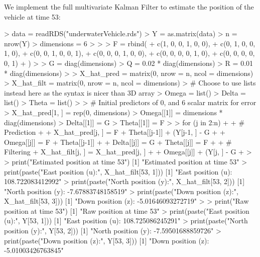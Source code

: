 \documentclass{article}
\begin{document}
{We implement the full multivariate Kalman Filter to estimate the position of the vehicle at time 53:
\begin{spverbatim}
> data = readRDS("underwaterVehicle.rds")
> Y = as.matrix(data)
> n = nrow(Y)
> dimensions = 6
> 
> 
> F = rbind(
+   c(1, 0, 0, 1, 0, 0),
+   c(0, 1, 0, 0, 1, 0),
+   c(0, 0, 1, 0, 0, 1),
+   c(0, 0, 0, 1, 0, 0),
+   c(0, 0, 0, 0, 1, 0),
+   c(0, 0, 0, 0, 0, 1)
+ )
> 
> G = diag(dimensions)
> Q = 0.02 * diag(dimensions)
> R = 0.01 * diag(dimensions)
> 
> X_hat_pred = matrix(0, nrow = n, ncol = dimensions)
> X_hat_filt = matrix(0, nrow = n, ncol = dimensions)
> # Choose to use lists instead here as the syntax is nicer than 3D array
> Omega = list()
> Delta = list()
> Theta = list()
> 
> # Initial predictors of 0, and 6 scalar matrix for error 
> X_hat_pred[1, ] = rep(0, dimensions)
> Omega[[1]] = dimensions * diag(dimensions)
> Delta[[1]] = G %
> Theta[[1]] = F %
> 
> for (j in 2:n) {
+   
+   # Prediction
+   
+   X_hat_pred[j, ] = F %
+     Theta[[j-1]] %
+     (Y[j-1, ] - G %
+   
+   Omega[[j]] = F %
+     Theta[[j-1]] %
+   
+   Delta[[j]] = G %
+   Theta[[j]] = F %
+ 
+   # Filtering 
+   X_hat_filt[j, ] = X_hat_pred[j, ] +
+     Omega[[j]] %
+     (Y[j, ] - G %
+ }
> 
> print("Estimated position at time 53")
[1] "Estimated position at time 53"
> print(paste("East position (u):", X_hat_filt[53, 1]))
[1] "East position (u): 108.722083412992"
> print(paste("North position (y):", X_hat_filt[53, 2]))
[1] "North position (y): -7.67883748158519"
> print(paste("Down position (z):", X_hat_filt[53, 3]))
[1] "Down position (z): -5.01646093272719"
> 
> print("Raw position at time 53")
[1] "Raw position at time 53"
> print(paste("East position (u):", Y[53, 1]))
[1] "East position (u): 108.725086245291"
> print(paste("North position (y):", Y[53, 2]))
[1] "North position (y): -7.59501688859726"
> print(paste("Down position (z):", Y[53, 3]))
[1] "Down position (z): -5.01003426763845"
\end{spverbatim}

}
\end{document}
